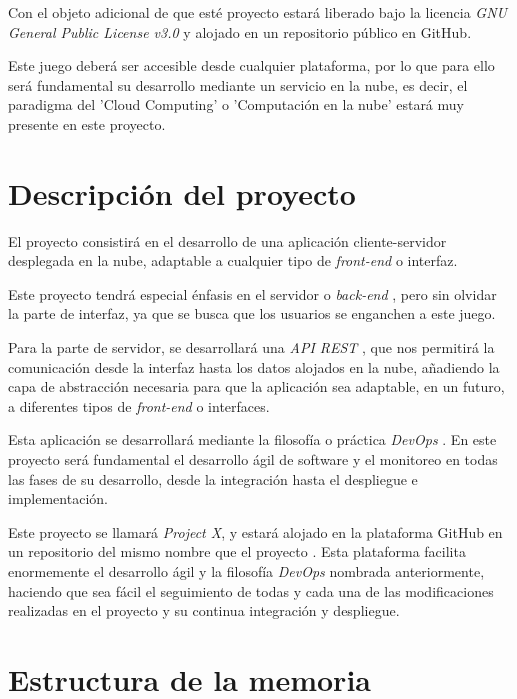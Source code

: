 Con el objeto adicional de que esté proyecto estará liberado bajo la licencia \textit{GNU General Public License v3.0} \cite{licenciaproyecto} y alojado en un repositorio público en GitHub.

Este juego deberá ser accesible desde cualquier plataforma, por lo que para ello será fundamental su desarrollo mediante un servicio en la nube, es decir, el paradigma del 'Cloud Computing' o 'Computación en la nube' \cite{nube1} estará muy presente en este proyecto.

\section{Descripción del proyecto}

El proyecto consistirá en el desarrollo de una aplicación cliente-servidor desplegada en la nube, adaptable a cualquier tipo de \textit{front-end} \cite{frontback} o interfaz.

Este proyecto tendrá especial énfasis en el servidor o \textit{back-end} \cite{frontback}, pero sin olvidar la parte de interfaz, ya que se busca que los usuarios se enganchen a este juego.

Para la parte de servidor, se desarrollará una \textit{API REST} \cite{api1} \cite{api2} \cite{api3}, que nos permitirá la comunicación desde la interfaz hasta los datos alojados en la nube, añadiendo la capa de abstracción necesaria para que la aplicación sea adaptable, en un futuro, a diferentes tipos de \textit{front-end} o interfaces. 

Esta aplicación se desarrollará mediante la filosofía o práctica \textit{DevOps} \cite{devops1} \cite{devops2} \cite{devops3} \cite{devops4}. En este proyecto será fundamental el desarrollo ágil de software y el monitoreo en todas las fases de su desarrollo, desde la integración hasta el despliegue e implementación.

Este proyecto se llamará \textit{Project X}, y estará alojado en la plataforma GitHub en un repositorio del mismo nombre que el proyecto \cite{proyectogithub}. Esta plataforma facilita enormemente el desarrollo ágil y la filosofía \textit{DevOps} nombrada anteriormente, haciendo que sea fácil el seguimiento de todas y cada una de las modificaciones realizadas en el proyecto y su continua integración y despliegue.

\section{Estructura de la memoria}

